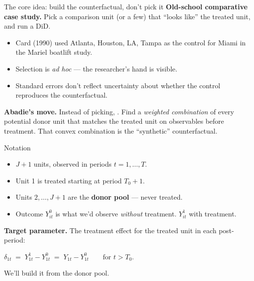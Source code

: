 \documentclass[aspectratio=169,11pt]{beamer}
\begin{document}
\begin{frame}{The core idea: build the counterfactual, don't pick it}
\vspace{0.5em}
\textbf{Old-school comparative case study.} \;Pick a comparison unit (or a few) that ``looks like'' the treated unit, and run a DiD.
\vspace{0.4em}
\begin{itemize}\small
  \item Card (1990) used Atlanta, Houston, LA, Tampa as the control for Miami in the Mariel boatlift study.
  \item Selection is \textit{ad hoc} --- the researcher's hand is visible.
  \item Standard errors don't reflect uncertainty about whether the control reproduces the counterfactual.
\end{itemize}

\vspace{0.7em}
\textbf{Abadie's move.} \;Instead of picking, . \;Find a \textit{weighted combination} of every potential donor unit that matches the treated unit on observables before treatment. \;That convex combination is the ``synthetic'' counterfactual.
\end{frame}

\begin{frame}{Notation}
\vspace{0.5em}
\begin{itemize}
  \item $J{+}1$ units, observed in periods $t = 1, \dots, T$.
  \item Unit 1 is treated starting at period $T_0 + 1$.
  \item Units $2, \dots, J{+}1$ are the \textbf{donor pool} --- never treated.
  \item Outcome $Y_{it}^0$ is what we'd observe \textit{without} treatment. \;$Y_{it}^1$ with treatment.
\end{itemize}

\vspace{0.7em}
\textbf{Target parameter.} \;The treatment effect for the treated unit in each post-period:
\begin{center}
$\delta_{1t} \;=\; Y_{1t}^1 - Y_{1t}^0 \;=\; Y_{1t} - Y_{1t}^0 \qquad \text{for } t > T_0.$
\end{center}

\vspace{0.5em}
 \;We'll build it from the donor pool.
\end{frame}
\end{document}
